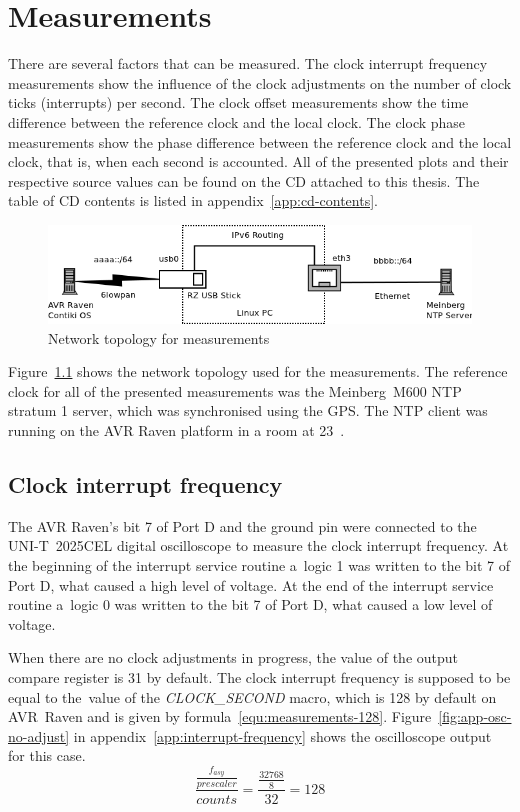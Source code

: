 
\chapter{Measurements}\label{chap:measurements}
There are several factors that can be measured.
The clock interrupt frequency measurements show the influence of the clock adjustments
on the number of clock ticks (interrupts) per second.
The clock offset measurements show the time difference between the reference clock and
the local clock.
The clock phase measurements show the phase difference between the reference clock and
the local clock, that is, when each second is accounted.
All of the presented plots and their respective source values can be found on the CD
attached to this thesis.
The table of CD contents is listed in appendix~\ref{app:cd-contents}.
\begin{figure}[H]
	\centering
	\includegraphics[width=13cm,keepaspectratio]{fig/radvd-routing.png}
	\caption{Network topology for measurements}
	\label{fig:measurements-routing}
\end{figure}
Figure~\ref{fig:measurements-routing} shows the network topology used for the measurements.
The reference clock for all of the presented measurements was
the Meinberg~M600 NTP stratum 1 server, which was synchronised using the GPS.
The NTP client was running on the AVR Raven platform in a room at 23~\textcelsius.

\section{Clock interrupt frequency}
The AVR Raven's bit 7 of Port D and the ground pin were
connected to the UNI-T~2025CEL digital oscilloscope
to measure the clock interrupt frequency.
At the beginning of the interrupt service routine a~logic 1 was written
to the bit 7 of Port D, what caused a high level of voltage.
At the end of the interrupt service routine a~logic 0 was written
to the bit 7 of Port D, what caused a low level of voltage.

When there are no clock adjustments in progress, the value of the output compare register is 31 by default.
The clock interrupt frequency
is supposed to be equal to the~value of the {\it{CLOCK\_SECOND}} macro, which is 128 by default on AVR~Raven
and is given by formula~\ref{equ:measurements-128}.
Figure~\ref{fig:app-osc-no-adjust} in appendix~\ref{app:interrupt-frequency} shows the oscilloscope output 
for this case.
\begin{equation}
\label{equ:measurements-128}
\frac{\frac{f_{asy}}{prescaler}}{counts} = \frac{\frac{32768}{8}}{32} = 128
\end{equation}

